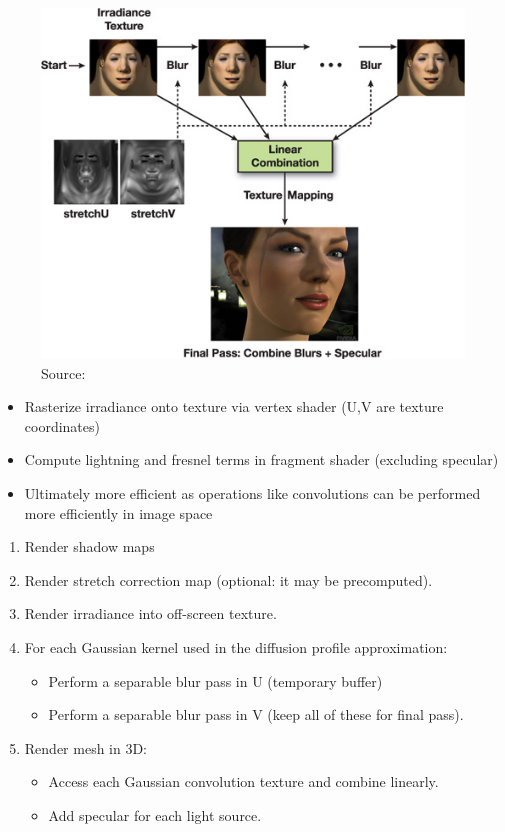 \documentclass[ngerman,runningheads,a4paper]{llncs}[2018/03/10]
\begin{document}
\begin{figure}
  \centering
  \includegraphics[scale=0.8,keepaspectratio]{./images/texture-space-algorithm.jpg}
  \caption{Source: \citet{efficient-human-skin-rendering}}
\end{figure}

\begin{itemize}
  \item Rasterize irradiance onto texture via vertex shader (U,V are texture coordinates)
  \item Compute lightning and fresnel terms in fragment shader (excluding specular)
  \item Ultimately more efficient as operations like convolutions can be performed more efficiently in image space
\end{itemize}

\begin{enumerate}
  \item Render shadow maps
  \item Render stretch correction map (optional: it may be precomputed).
  \item Render irradiance into off-screen texture.
  \item For each Gaussian kernel used in the diffusion profile approximation:
    \begin{itemize}
      \item Perform a separable blur pass in U (temporary buffer)
      \item Perform a separable blur pass in V (keep all of these for final pass).
    \end{itemize}
  \item Render mesh in 3D:
    \begin{itemize}
      \item Access each Gaussian convolution texture and combine linearly.
      \item Add specular for each light source.
    \end{itemize}
\end{enumerate}
\end{document}
